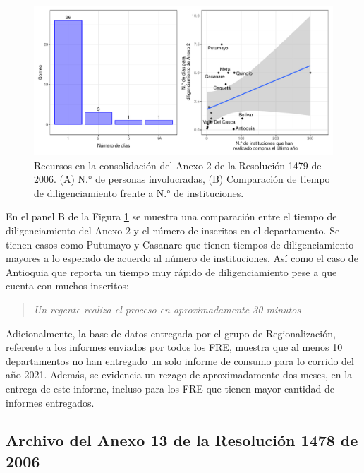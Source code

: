 \documentclass[
]{book}
\begin{document}
\begin{figure}

{\centering \includegraphics[width=1\linewidth]{InformeFinal_files/figure-latex/TiemposConsolidacionA2-1} 

}

\caption{Recursos en la consolidación del Anexo 2 de la Resolución 1479 de 2006. (A) N.° de personas involucradas, (B) Comparación de tiempo de diligenciamiento frente a N.° de instituciones.}\label{fig:TiemposConsolidacionA2}
\end{figure}

En el panel B de la Figura \ref{fig:TiemposConsolidacionA2} se muestra una comparación entre el tiempo de diligenciamiento del Anexo 2 y el número de inscritos en el departamento. Se tienen casos como Putumayo y Casanare que tienen tiempos de diligenciamiento mayores a lo esperado de acuerdo al número de instituciones. Así como el caso de Antioquia que reporta un tiempo muy rápido de diligenciamiento pese a que cuenta con muchos inscritos:

\begin{quote}
\emph{Un regente realiza el proceso en aproximadamente 30 minutos}
\end{quote}

Adicionalmente, la base de datos entregada por el grupo de Regionalización, referente a los informes enviados por todos los FRE, muestra que al menos 10 departamentos no han entregado un solo informe de consumo para lo corrido del año 2021. Además, se evidencia un rezago de aproximadamente dos meses, en la entrega de este informe, incluso para los FRE que tienen mayor cantidad de informes entregados.

\hypertarget{archivo-del-anexo-13-de-la-resoluciuxf3n-1478-de-2006}{%
\subsection{Archivo del Anexo 13 de la Resolución 1478 de 2006}\label{archivo-del-anexo-13-de-la-resoluciuxf3n-1478-de-2006}}
\end{document}
